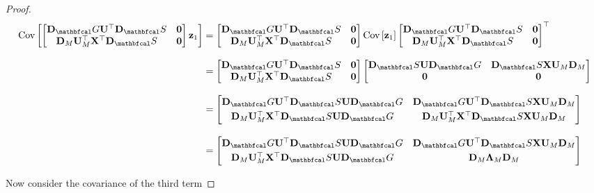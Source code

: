 \begin{proof}
\begin{align*}
    \text{Cov}\left[\begin{bmatrix}
        \D_\Gt \U^\top \D_\St & \zero \\
        \D_M \U_M^\top \X^\top \D_\St & \zero
    \end{bmatrix} \z_1 \right] &= \begin{bmatrix}
        \D_\Gt \U^\top \D_\St & \zero \\
        \D_M \U_M^\top \X^\top \D_\St & \zero
    \end{bmatrix} \text{Cov}\left[ \z_1 \right] \begin{bmatrix}
        \D_\Gt \U^\top \D_\St & \zero \\
        \D_M \U_M^\top \X^\top \D_\St & \zero
    \end{bmatrix}^\top \\[0.3cm]
    &= \begin{bmatrix}
        \D_\Gt \U^\top \D_\St & \zero \\
        \D_M \U_M^\top \X^\top \D_\St & \zero
    \end{bmatrix} \begin{bmatrix}
        \D_\St \U \D_\Gt  &  \D_\St \X \U_M \D_M  \\
         \zero  & \zero
    \end{bmatrix} \\[0.3cm]
    &= \begin{bmatrix}
        \D_\Gt \U^\top \D_\St \U \D_\Gt  &  \D_\Gt \U^\top \D_\St \X \U_M \D_M \\[0.1cm] 
        \D_M \U_M^\top \X^\top \D_\St \U \D_\Gt & \D_M \U_M^\top \X^\top \D_\St \X \U_M \D_M 
        \end{bmatrix} \\[0.3cm]
    &= \begin{bmatrix}
        \D_\Gt \U^\top \D_\St \U \D_\Gt  &  \D_\Gt \U^\top \D_\St \X \U_M \D_M \\[0.1cm] 
        \D_M \U_M^\top \X^\top \D_\St \U \D_\Gt & \D_M \LAM_M \D_M 
        \end{bmatrix} \\
\end{align*}

Now consider the covariance of the third term


\end{proof}
